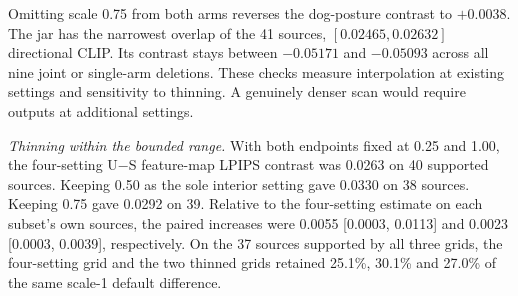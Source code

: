 Omitting scale 0.75 from both arms reverses the dog-posture contrast to $+0.0038$. The jar has the narrowest overlap of the 41 sources, $[0.02465,0.02632]$ directional CLIP. Its contrast stays between $-0.05171$ and $-0.05093$ across all nine joint or single-arm deletions. These checks measure interpolation at existing settings and sensitivity to thinning. A genuinely denser scan would require outputs at additional settings.

\noindent\textit{Thinning within the bounded range.}
With both endpoints fixed at 0.25 and 1.00, the four-setting U$-$S feature-map LPIPS contrast was 0.0263 on 40 supported sources. Keeping 0.50 as the sole interior setting gave 0.0330 on 38 sources. Keeping 0.75 gave 0.0292 on 39. Relative to the four-setting estimate on each subset's own sources, the paired increases were 0.0055 [0.0003, 0.0113] and 0.0023 [0.0003, 0.0039], respectively. On the 37 sources supported by all three grids, the four-setting grid and the two thinned grids retained 25.1\%, 30.1\% and 27.0\% of the same scale-1 default difference.

